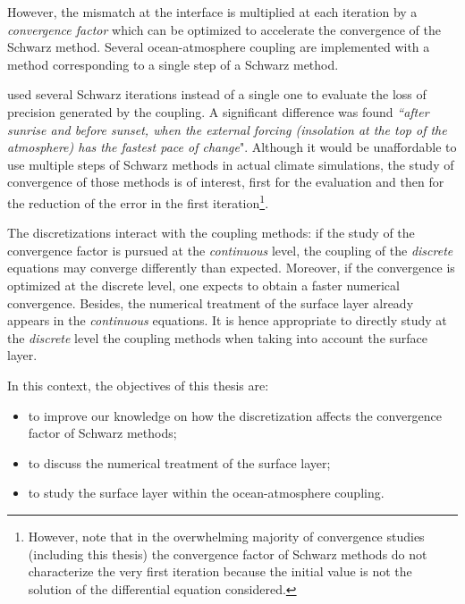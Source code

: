 However, the mismatch at the interface is multiplied
at each iteration by a \textit{convergence factor} which
can be optimized to accelerate the convergence of the
Schwarz method.
Several ocean-atmosphere coupling are implemented with
a method corresponding to a single step of a Schwarz method.
\par %
\citep{marti_schwarz_2021} used several Schwarz iterations
instead of a single one to evaluate the loss of precision
generated by the coupling. A significant difference was found
\textit{``after sunrise
and before sunset, when the external forcing (insolation at
the top of the atmosphere) has the fastest pace of change}".
Although it would be unaffordable to use multiple
steps of Schwarz methods in actual climate simulations,
the study of convergence of those methods is of interest,
first for the evaluation and then for the reduction of the
error in the first iteration\footnote{However, note that
in the overwhelming majority of convergence studies
(including this thesis) the convergence factor of
Schwarz methods do not characterize the very first iteration
because the initial value is not the solution of the
differential equation considered.}.
\par %
The discretizations interact with the coupling methods:
if the study of the convergence factor is pursued at the
\textit{continuous} level, the coupling of the \textit{discrete}
equations may converge differently than expected. Moreover,
if the convergence is optimized at the discrete level, one expects
to obtain a faster numerical convergence.
Besides, the numerical treatment of the surface layer already
appears in the \textit{continuous} equations.
It is hence appropriate to directly study at the \textit{discrete}
level the coupling methods when taking into account
the surface layer.
\par %
In this context, the objectives of this thesis are:
\begin{itemize}
\item to improve our knowledge on how the discretization affects
the convergence factor of Schwarz methods;
\item to discuss the numerical treatment of the surface layer;
\item to study the surface layer within the ocean-atmosphere coupling.
\end{itemize}
